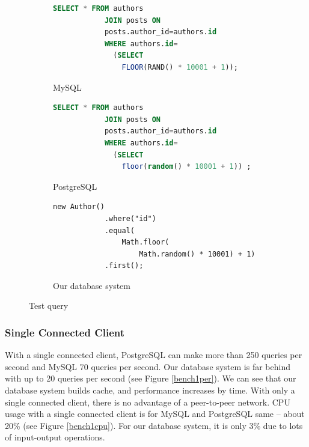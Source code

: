 \begin{figure}[h]
    \begin{subfigure}{.3\textwidth}
        \centering
        \begin{lstlisting}[language=SQL,basicstyle=\tiny]
            SELECT * FROM authors 
            JOIN posts ON 
            posts.author_id=authors.id  
            WHERE authors.id=
              (SELECT 
                FLOOR(RAND() * 10001 + 1));
        \end{lstlisting}
        \caption{MySQL}
    \end{subfigure}%
    \begin{subfigure}{.3\textwidth}
        \centering
        \begin{lstlisting}[language=SQL,basicstyle=\tiny]
            SELECT * FROM authors 
            JOIN posts ON 
            posts.author_id=authors.id  
            WHERE authors.id=
              (SELECT 
                floor(random() * 10001 + 1)) ;
        \end{lstlisting}
        \caption{PostgreSQL}
    \end{subfigure}
    \begin{subfigure}{.4\textwidth}
        \centering
        \begin{lstlisting}[style=ES6,basicstyle=\tiny]
            new Author()
            .where("id")
            .equal(
                Math.floor(
                    Math.random() * 10001) + 1)
            .first();
        \end{lstlisting}
        \caption{Our database system}
    \end{subfigure}
    \caption{Test query}
    \label{benchQuery}
\end{figure}


\subsubsection*{Single Connected Client}
With a single connected client, PostgreSQL can make more than 250 queries per second and MySQL 70 queries per second. Our database system is far behind with up to 20 queries per second (see Figure \ref{bench1per}). We can see that our database system builds cache, and performance increases by time. With only a single connected client, there is no advantage of a peer-to-peer network. CPU usage with a single connected client is for MySQL and PostgreSQL same -- about 20\% (see Figure \ref{bench1cpu}). For our database system, it is only 3\% due to lots of input-output operations. 


